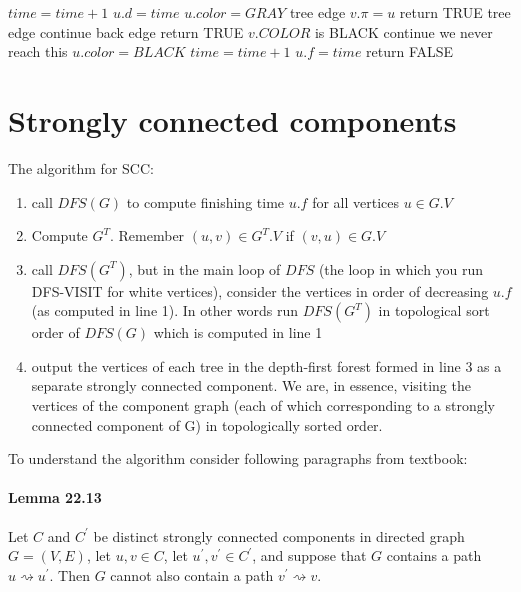 \documentclass{book}
\begin{document}
	\begin{algorithm*}
		\begin{algorithmic}[1]
				\State $time = time + 1$
				\State $u.d = time$
				\State $u.color = GRAY$
					 \Comment tree edge
						\State $v.\pi = u$
							\State return TRUE
						\EndIf
					 \Comment  tree edge
						\State continue
					 \Comment back edge
					\State return TRUE
					\Else	\Comment $v.COLOR$ is BLACK
						\State continue	\Comment we never reach this
					\EndIf
				\EndFor
				\State $u.color = BLACK$
				\State $time = time + 1$
				\State $u.f = time$
				\State return FALSE
			\EndFunction
		\end{algorithmic}
	\end{algorithm*}
	\FloatBarrier
	
	\section{Strongly connected components}
	The algorithm for SCC:
	
	\begin{enumerate}
	\item call $DFS(G)$ to compute finishing time $u.f$ for all vertices $u \in G.V$
	\item Compute $G^T$. Remember $(u, v) \in G^T.V$ if $(v, u) \in G.V$
	\item call $DFS(G^T)$, but in the main loop of $DFS$ (the loop in which you run DFS-VISIT for white vertices), consider the vertices in order of decreasing $u.f$ (as computed in line 1). In other words run $DFS(G^T)$ in topological sort order of $DFS(G)$ which is computed in line 1
	\item output the vertices of each tree in the depth-first forest formed in line 3 as a separate strongly connected component. We are, in essence, visiting the vertices of the component graph (each of which corresponding to a strongly connected component of G) in topologically sorted order.
	\end{enumerate}
	
	To understand the algorithm consider following paragraphs from textbook:
	
	\paragraph{Lemma 22.13} Let $C$ and $C^\prime$ be distinct strongly connected components in directed graph $G = (V, E)$, let $u, v \in C$, let $u^\prime, v^\prime \in C^\prime$, and suppose that $G$ contains a path $u \rightsquigarrow u^\prime$. Then $G$ cannot also contain a path $v^\prime \rightsquigarrow v$.
	
\end{document}
